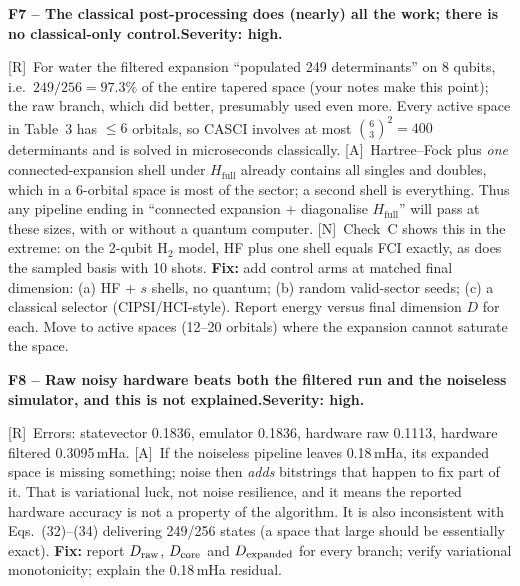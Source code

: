 \documentclass[11pt,a4paper]{article}
\newcommand{\Ht}{H_{\mathrm{full}}}
\newcommand{\lR}{\textcolor{keyblue}{[R]}}   %
\newcommand{\lA}{\textcolor{notegray}{[A]}}  %
\newcommand{\lN}{\textcolor{keyblue}{[N]}}   %
\newcommand{\sev}[1]{\textbf{Severity: #1.}}
\newcommand{\flaw}[4]{\par\medskip\noindent\textbf{#1 -- #2.}\quad{\small\textcolor{notegray}{Where: #3.}}\quad\sev{#4}\par\nobreak}
\begin{document}
\flaw{F7}{The classical post-processing does (nearly) all the work; there is no classical-only control}{p.~10, Sec.~4.2; p.~11, Table~3}{high}
\lR\ For water the filtered expansion ``populated 249 determinants'' on 8 qubits, i.e.\ $249/256=97.3\%$ of the entire tapered space (your notes make this point); the raw branch, which did better, presumably used even more. Every active space in Table~3 has $\le6$ orbitals, so CASCI involves at most $\binom{6}{3}^2=400$ determinants and is solved in microseconds classically. \lA\ Hartree--Fock plus \emph{one} connected-expansion shell under $\Ht$ already contains all singles and doubles, which in a 6-orbital space is most of the sector; a second shell is everything. Thus any pipeline ending in ``connected expansion + diagonalise $\Ht$'' will pass at these sizes, with or without a quantum computer. \lN\ Check~C shows this in the extreme: on the 2-qubit H$_2$ model, HF plus one shell equals FCI exactly, as does the sampled basis with 10 shots. \textbf{Fix:} add control arms at matched final dimension: (a) HF + $s$ shells, no quantum; (b) random valid-sector seeds; (c) a classical selector (CIPSI/HCI-style). Report energy versus final dimension $D$ for each. Move to active spaces (12--20 orbitals) where the expansion cannot saturate the space.

\flaw{F8}{Raw noisy hardware beats both the filtered run and the noiseless simulator, and this is not explained}{p.~10, Table~1}{high}
\lR\ Errors: statevector 0.1836, emulator 0.1836, hardware raw 0.1113, hardware filtered 0.3095\,mHa. \lA\ If the noiseless pipeline leaves 0.18\,mHa, its expanded space is missing something; noise then \emph{adds} bitstrings that happen to fix part of it. That is variational luck, not noise resilience, and it means the reported hardware accuracy is not a property of the algorithm. It is also inconsistent with Eqs.~(32)--(34) delivering 249/256 states (a space that large should be essentially exact). \textbf{Fix:} report $D_{\rm raw}$, $D_{\rm core}$ and $D_{\rm expanded}$ for every branch; verify variational monotonicity; explain the 0.18\,mHa residual.
\end{document}
